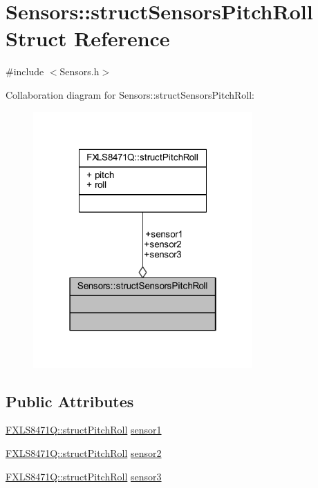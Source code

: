 \hypertarget{struct_sensors_1_1struct_sensors_pitch_roll}{}\section{Sensors\+:\+:struct\+Sensors\+Pitch\+Roll Struct Reference}
\label{struct_sensors_1_1struct_sensors_pitch_roll}


{\ttfamily \#include $<$Sensors.\+h$>$}



Collaboration diagram for Sensors\+:\+:struct\+Sensors\+Pitch\+Roll\+:\nopagebreak
\begin{figure}[H]
\begin{center}
\leavevmode
\includegraphics[width=238pt]{struct_sensors_1_1struct_sensors_pitch_roll__coll__graph}
\end{center}
\end{figure}
\subsection*{Public Attributes}
\begin{DoxyCompactItemize}
\item 
\hyperlink{struct_f_x_l_s8471_q_1_1struct_pitch_roll}{F\+X\+L\+S8471\+Q\+::struct\+Pitch\+Roll} \hyperlink{struct_sensors_1_1struct_sensors_pitch_roll_a61c1e63295d310224a0097a2cf4ca7f0}{sensor1}
\item 
\hyperlink{struct_f_x_l_s8471_q_1_1struct_pitch_roll}{F\+X\+L\+S8471\+Q\+::struct\+Pitch\+Roll} \hyperlink{struct_sensors_1_1struct_sensors_pitch_roll_a7d66e26e726b7a8d065b67b19e6305ef}{sensor2}
\item 
\hyperlink{struct_f_x_l_s8471_q_1_1struct_pitch_roll}{F\+X\+L\+S8471\+Q\+::struct\+Pitch\+Roll} \hyperlink{struct_sensors_1_1struct_sensors_pitch_roll_a57bd3f7dc8949180c8caa4b2b4a06d8f}{sensor3}
\end{DoxyCompactItemize}


